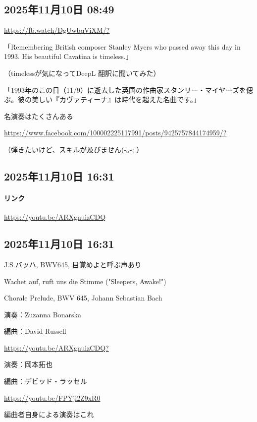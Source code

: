 \subsection*{2025年11月10日 08:49}

\url{https://fb.watch/DgUwbqViXM/?}

「Remembering British composer Stanley Myers who passed away this day in 1993.  His beautiful Cavatina is timeless.」

（timelessが気になってDeepL 翻訳に聞いてみた）

「1993年のこの日（11/9）に逝去した英国の作曲家スタンリー・マイヤーズを偲ぶ。彼の美しい『カヴァティーナ』は時代を超えた名曲です。」

名演奏はたくさんある

\url{https://www.facebook.com/100002225117991/posts/9425757844174959/?}

（弾きたいけど、スキルが及びません(-｡-; ）

\subsection*{2025年11月10日 16:31}

\paragraph{リンク}
\url{https://youtu.be/ARXgnuizCDQ}

\subsection*{2025年11月10日 16:31}

J.S.バッハ, BWV645, 目覚めよと呼ぶ声あり

Wachet auf, ruft uns die Stimme ("Sleepers, Awake!")

Chorale Prelude, BWV 645, Johann Sebastian Bach

演奏：Zuzanna Bonarska

編曲：David Russell

\url{https://youtu.be/ARXgnuizCDQ?}

演奏：岡本拓也

編曲：デビッド・ラッセル

\url{https://youtu.be/FPYji2Z9xR0}

編曲者自身による演奏はこれ

